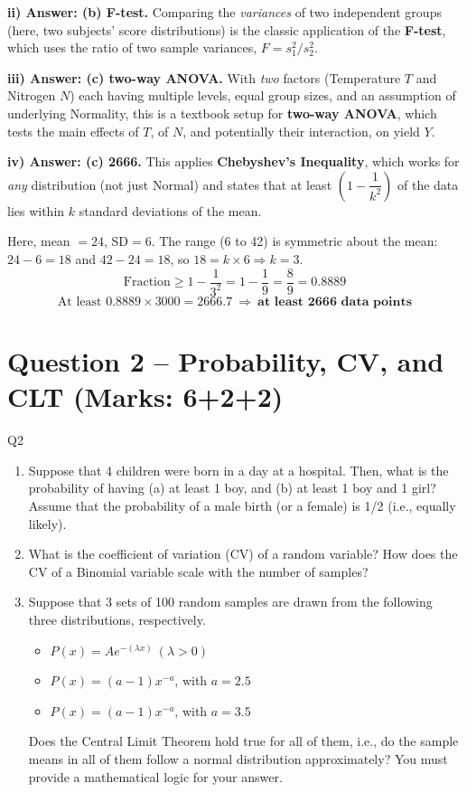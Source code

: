 \documentclass[11pt]{article}
\begin{document}
\textbf{ii) Answer: (b) F-test.}
Comparing the \emph{variances} of two independent groups (here, two subjects' score distributions) is the classic application of the \textbf{F-test}, which uses the ratio of two sample variances, $F = s_1^2/s_2^2$.

\textbf{iii) Answer: (c) two-way ANOVA.}
With \emph{two} factors (Temperature $T$ and Nitrogen $N$) each having multiple levels, equal group sizes, and an assumption of underlying Normality, this is a textbook setup for \textbf{two-way ANOVA}, which tests the main effects of $T$, of $N$, and potentially their interaction, on yield $Y$.

\textbf{iv) Answer: (c) 2666.}
This applies \textbf{Chebyshev's Inequality}, which works for \emph{any} distribution (not just Normal) and states that at least $\left(1-\dfrac{1}{k^2}\right)$ of the data lies within $k$ standard deviations of the mean.

Here, mean $=24$, SD$=6$. The range (6 to 42) is symmetric about the mean: $24-6=18$ and $42-24=18$, so $18 = k\times 6 \Rightarrow k=3$.
\[
\text{Fraction} \ge 1-\frac{1}{3^2} = 1-\frac{1}{9} = \frac{8}{9} = 0.8889
\]
\[
\boxed{\text{At least } 0.8889 \times 3000 = 2666.7\ \Rightarrow\ \textbf{at least 2666 data points}}
\]

\section{Question 2 -- Probability, CV, and CLT (Marks: 6+2+2)}
\begin{question}{Q2}
\begin{enumerate}[label=\roman*)]
\item Suppose that 4 children were born in a day at a hospital. Then, what is the probability of having (a) at least 1 boy, and (b) at least 1 boy and 1 girl? Assume that the probability of a male birth (or a female) is 1/2 (i.e., equally likely).
\item What is the coefficient of variation (CV) of a random variable? How does the CV of a Binomial variable scale with the number of samples?
\item Suppose that 3 sets of 100 random samples are drawn from the following three distributions, respectively.
\begin{itemize}
\item[(a)] $P(x) = Ae^{-(\lambda x)}\ (\lambda>0)$
\item[(b)] $P(x) = (a-1)x^{-a}$, with $a=2.5$
\item[(c)] $P(x) = (a-1)x^{-a}$, with $a=3.5$
\end{itemize}
Does the Central Limit Theorem hold true for all of them, i.e., do the sample means in all of them follow a normal distribution approximately? You must provide a mathematical logic for your answer.
\end{enumerate}
\end{question}
\end{document}
